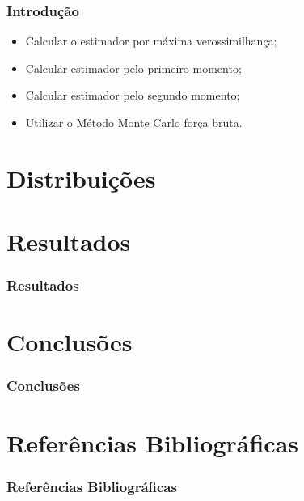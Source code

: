 \documentclass[12pt]{beamer}
\begin{document}
\begin{frame}
\frametitle{Introdução}
\begin{itemize}
\item Calcular o estimador por máxima verossimilhança;

\bigskip

\item Calcular estimador pelo primeiro momento;

\bigskip

\item Calcular estimador pelo segundo momento;

\bigskip

\item Utilizar o Método Monte Carlo força bruta.

\end{itemize}
\end{frame}


\section{Distribuições}





\section{Resultados}

\begin{frame}
\frametitle{Resultados}

\end{frame}

\section{Conclusões}

\begin{frame}
\frametitle{Conclusões}

\end{frame}

\section{Referências Bibliográficas}

\begin{frame}
\frametitle{Referências Bibliográficas}







\end{frame}
\end{document}
